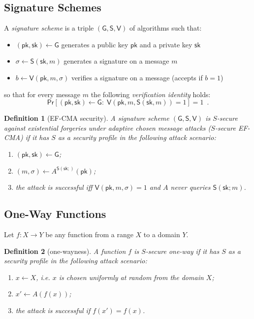 \documentclass{article}
\newtheorem{definition}{Definition}[section]
\newcommand{\keygen}[0]{\mathsf{G}}
\newcommand{\sig}[0]{\mathsf{S}}
\newcommand{\sigver}[0]{\mathsf{V}}
\newcommand{\pubkey}[0]{\mathsf{pk}}
\newcommand{\prikey}[0]{\mathsf{sk}}
\begin{document}
\subsection{Signature Schemes}

A \emph{signature scheme} is a triple $(\keygen, \sig, \sigver)$ of algorithms such that:
\begin{itemize}
\item $(\pubkey, \prikey) \gets \keygen$ generates a public key $\pubkey$ and a private key $\prikey$
\item $\sigma \gets \sig(\prikey, m)$ generates a signature on a message $m$
\item $b \gets \sigver (\pubkey, m, \sigma)$ verifies a signature on a message (accepts if $b = 1$)
\end{itemize}
so that for every message $m$ the following \emph{verification identity} holds:
\[
\mathsf{Pr}[(\pubkey, \prikey) \gets \keygen \colon\; \sigver(\pubkey, m, \sig(\prikey, m)) = 1] = 1 \enspace.
\]

\begin{definition}[EF-CMA security]
A signature scheme $(\keygen, \sig, \sigver)$ is $S$-secure against existential forgeries under adaptive chosen message attacks ($S$-secure EF-CMA) if it has $S$ as a security profile in the following attack scenario:
\begin{enumerate}
\item $(\pubkey, \prikey) \gets \keygen$;
\item $(m,\sigma)\gets A^{\mathsf{S}(\prikey;)}(\pubkey)$;
\item the attack is successful iff $\mathsf{V}(\pubkey, m, \sigma)=1$
and $A$ never queries $\mathsf{S}(\prikey;m)$.
\end{enumerate}
\end{definition}

\subsection{One-Way Functions}

Let $f\colon X \rightarrow Y$ be any function from a range $X$ to a domain $Y$.

\begin{definition}[one-wayness]
A function $f$ is $S$-secure one-way if it has $S$ as a security profile in the following attack scenario:
\begin{enumerate}
\item $x\gets X$, i.e. $x$ is chosen uniformly at random from the domain $X$;
\item $x'\gets A(f(x))$;
\item the attack is successful if $f(x')=f(x)$.
\end{enumerate}
\end{definition}
\end{document}
